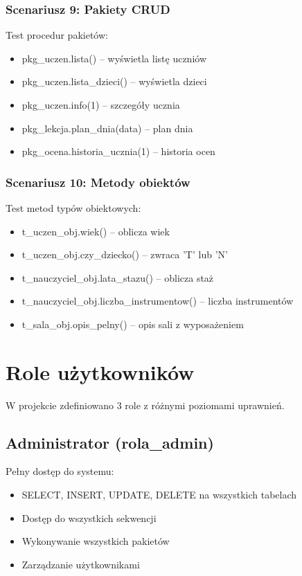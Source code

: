 \documentclass[12pt,a4paper]{article}
\begin{document}
\subsubsection{Scenariusz 9: Pakiety CRUD}
Test procedur pakietów:
\begin{itemize}[nosep]
    \item pkg\_uczen.lista() -- wyświetla listę uczniów
    \item pkg\_uczen.lista\_dzieci() -- wyświetla dzieci
    \item pkg\_uczen.info(1) -- szczegóły ucznia
    \item pkg\_lekcja.plan\_dnia(data) -- plan dnia
    \item pkg\_ocena.historia\_ucznia(1) -- historia ocen
\end{itemize}

\subsubsection{Scenariusz 10: Metody obiektów}
Test metod typów obiektowych:
\begin{itemize}[nosep]
    \item t\_uczen\_obj.wiek() -- oblicza wiek
    \item t\_uczen\_obj.czy\_dziecko() -- zwraca 'T' lub 'N'
    \item t\_nauczyciel\_obj.lata\_stazu() -- oblicza staż
    \item t\_nauczyciel\_obj.liczba\_instrumentow() -- liczba instrumentów
    \item t\_sala\_obj.opis\_pelny() -- opis sali z wyposażeniem
\end{itemize}

\section{Role użytkowników}

W projekcie zdefiniowano 3 role z różnymi poziomami uprawnień.

\subsection{Administrator (rola\_admin)}

Pełny dostęp do systemu:
\begin{itemize}[nosep]
    \item SELECT, INSERT, UPDATE, DELETE na wszystkich tabelach
    \item Dostęp do wszystkich sekwencji
    \item Wykonywanie wszystkich pakietów
    \item Zarządzanie użytkownikami
\end{itemize}
\end{document}
